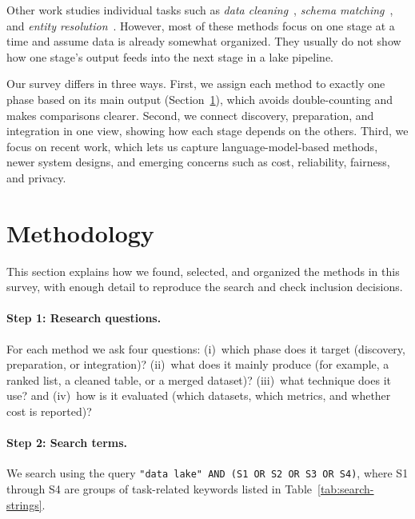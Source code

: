 \documentclass[sigconf]{acmart}
\begin{document}
Other work studies individual tasks such as \emph{data cleaning}~\cite{10.14778/3675034.3675051}, \emph{schema matching}~\cite{10.14778/3742728.3742757}, and \emph{entity resolution}~\cite{10.1145/3588722}. However, most of these methods focus on one stage at a time and assume data is already somewhat organized. They usually do not show how one stage's output feeds into the next stage in a lake pipeline.

Our survey differs in three ways. First, we assign each method to exactly one phase based on its main output (Section~\ref{sec:methodology}), which avoids double-counting and makes comparisons clearer. Second, we connect discovery, preparation, and integration in one view, showing how each stage depends on the others. Third, we focus on recent work, which lets us capture language-model-based methods, newer system designs, and emerging concerns such as cost, reliability, fairness, and privacy.


\section{Methodology}
\label{sec:methodology}
This section explains how we found, selected, and organized the methods in this survey, with enough detail to reproduce the search and check inclusion decisions.

\paragraph{Step 1: Research questions.}
For each method we ask four questions: (i)~which phase does it target (discovery, preparation, or integration)? (ii)~what does it mainly produce (for example, a ranked list, a cleaned table, or a merged dataset)? (iii)~what technique does it use? and (iv)~how is it evaluated (which datasets, which metrics, and whether cost is reported)?

\paragraph{Step 2: Search terms.}
We search using the query \texttt{"data lake" AND (S1 OR S2 OR S3 OR S4)}, where S1 through S4 are groups of task-related keywords listed in Table~\ref{tab:search-strings}.
\end{document}
